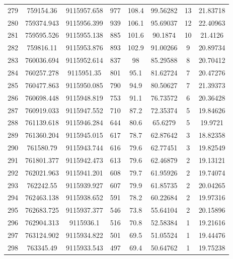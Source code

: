 \begin{longtable}{cccccccc}
279  & 759154.36       & 9115957.658      & 977     & 108.4 & 99.56282 & 13 & 21.83718 \\
280  & 759374.943      & 9115956.399      & 939     & 106.1 & 95.69037 & 12 & 22.40963 \\
281  & 759595.526      & 9115955.138      & 885     & 101.6 & 90.1874  & 10 & 21.4126  \\
282  & 759816.11       & 9115953.876      & 893     & 102.9 & 91.00266 & 9  & 20.89734 \\
283  & 760036.694      & 9115952.614      & 837     & 98    & 85.29588 & 8  & 20.70412 \\
284  & 760257.278      & 9115951.35       & 801     & 95.1  & 81.62724 & 7  & 20.47276 \\
285  & 760477.863      & 9115950.085      & 790     & 94.9  & 80.50627 & 7  & 21.39373 \\
286  & 760698.448      & 9115948.819      & 753     & 91.1  & 76.73572 & 6  & 20.36428 \\
287  & 760919.033      & 9115947.552      & 710     & 87.2  & 72.35374 & 5  & 19.84626 \\
288  & 761139.618      & 9115946.284      & 644     & 80.6  & 65.6279  & 5  & 19.9721  \\
289  & 761360.204      & 9115945.015      & 617     & 78.7  & 62.87642 & 3  & 18.82358 \\
290  & 761580.79       & 9115943.744      & 616     & 79.6  & 62.77451 & 3  & 19.82549 \\
291  & 761801.377      & 9115942.473      & 613     & 79.6  & 62.46879 & 2  & 19.13121 \\
292  & 762021.963      & 9115941.201      & 608     & 79.7  & 61.95926 & 2  & 19.74074 \\
293  & 762242.55       & 9115939.927      & 607     & 79.9  & 61.85735 & 2  & 20.04265 \\
294  & 762463.138      & 9115938.652      & 591     & 78.2  & 60.22684 & 2  & 19.97316 \\
295  & 762683.725      & 9115937.377      & 546     & 73.8  & 55.64104 & 2  & 20.15896 \\
296  & 762904.313      & 9115936.1        & 516     & 70.8  & 52.58384 & 1  & 19.21616 \\
297  & 763124.902      & 9115934.822      & 501     & 69.5  & 51.05524 & 1  & 19.44476 \\
298  & 763345.49       & 9115933.543      & 497     & 69.4  & 50.64762 & 1  & 19.75238 \\

\end{longtable}
